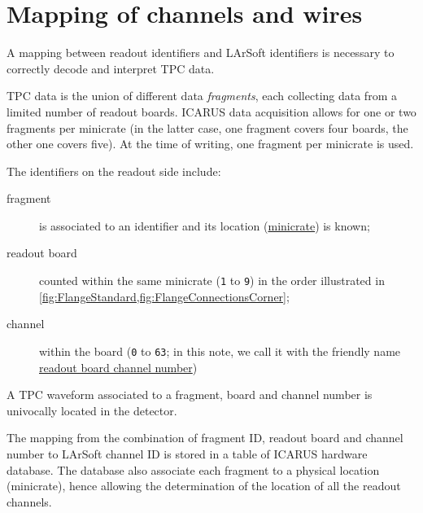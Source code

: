 \section{Mapping of channels and wires}
\label{sec:mapping}


A mapping between readout identifiers and LArSoft identifiers is necessary
to correctly decode and interpret TPC data.

TPC data is the union of different data \emph{fragments},
each collecting data from a limited number of readout boards.
ICARUS data acquisition allows for one or two fragments per minicrate
(in the latter case, one fragment covers four boards, the other one covers five).
At the time of writing, one fragment per minicrate is used.

The identifiers on the readout side include:
\begin{description}
  \item[fragment] is associated to an identifier and its location
    (\hyperlink{glossary:minicrate}{minicrate}) is known;
  \item[readout board] counted within the same minicrate (\texttt{1} to \texttt{9})
    in the order illustrated in \cref{fig:FlangeStandard,fig:FlangeConnectionsCorner};
  \item[channel] within the board (\texttt{0} to \texttt{63};
    in this note, we call it with the friendly name 
    \hyperlink{glossary:ReadoutChannelNumber}{readout board channel number})
\end{description}
A TPC waveform associated to a fragment, board and channel number
is univocally located in the detector.

The mapping from the combination of fragment ID, readout board and channel number
to LArSoft channel ID is stored in a table of ICARUS hardware database.
The database also associate each fragment to a physical location (minicrate),
hence allowing the determination of the location of all the readout channels.


